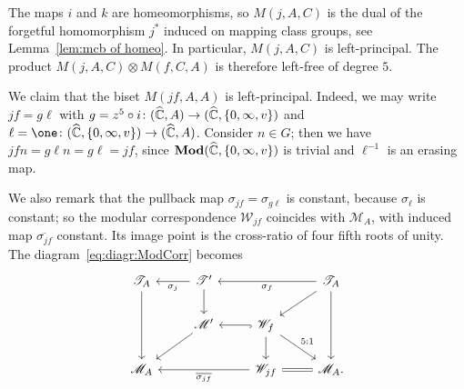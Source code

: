 \documentclass{amsart}
\begin{document}
The maps $i$ and $k$ are homeomorphisms, so $M(j,A,C)$ is the dual of
the forgetful homomorphism $j^*$ induced on mapping class groups, see
Lemma~\ref{lem:mcb of homeo}. In particular, $M(j,A,C)$ is
left-principal.  The product $M(j,A,C)\otimes M(f,C,A)$ is therefore
left-free of degree $5$.

We claim that the biset $M(j f,A,A)$ is left-principal. Indeed, we may
write $j f=g\ell$ with
$g=z^5\circ i\colon({\widehat{{\mathbb C}}},A)\to({\widehat{{\mathbb C}}},\{0,\infty,v\})$ and
$\ell=\one\colon(\hC,\{0,\infty,v\})\to(\hC,A)$. Consider $n\in G$;
then we have $j f n=g \ell n = g \ell = j f$, since
$\mathbf{\relax Mod}({\widehat{{\mathbb C}}},\{0,\infty,v\})$ is trivial and $\ell^{-1}$ is an erasing
map.

We also remark that the pullback map $\sigma_{j f}=\sigma_{g\ell}$ is
constant, because $\sigma_\ell$ is constant; so the modular
correspondence $\mathscr W_{j f}$ coincides with $\mathscr M_A$, with
induced map $\overline{\sigma_{j f}}$ constant. Its image point is the
cross-ratio of four fifth roots of unity. The
diagram~\eqref{eq:diagr:ModCorr} becomes
\[
  \begin{tikzcd}
    \mathscr T_A\ar{dd} & \mathscr T'\ar{l}{\sigma_j}\ar{d} & & \mathscr T_A\ar{ll}{\sigma_f}\ar{dl}\ar{dd}\\
    & \mathscr M'\ar{dl} & \mathscr W_f\ar[hook]{l}\ar{dr}{5:1}\ar{d}\\
    \mathscr M_A & & \mathscr W_{j f} \ar{ll}{\overline{\sigma_{j f}}}\ar[equal]{r} & \mathscr M_A.
  \end{tikzcd}
\]
\end{document}
